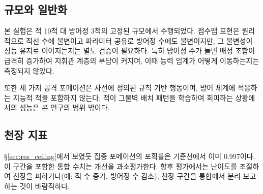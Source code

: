 \subsection{규모와 일반화}

본 실험은 적 10척 대 방어정 3척의 고정된 규모에서 수행되었다. 점수맵 표현은 원리적으로 적선
수에 불변이고 파라미터 공유로 방어정 수에도 불변이지만, 그 불변성이 성능 유지로 이어지는지는
별도 검증이 필요하다. 특히 방어정 수가 늘면 배정 조합이 급격히 증가하여 지휘관 계층의 부담이
커지며, 이때 능력 임계가 어떻게 이동하는지는 측정되지 않았다.

또한 세 가지 공격 포메이션은 사전에 정의된 규칙 기반 행동이며, 방어 체계에 적응하는 지능적
적을 포함하지 않는다. 적이 그물벽 배치 패턴을 학습하여 회피하는 상황에서의 성능은 본 연구의
범위 밖이다.

\subsection{천장 지표}

\S\ref{sec:res_ceiling}에서 보였듯 집중 포메이션의 포획률은 기준선에서 이미 0.997이다. 이
구간을 포함한 통합 수치는 개선을 과소평가한다. 향후 평가에서는 난이도를 조절하여 천장을
피하거나(예: 적 수 증가, 방어정 수 감소), 천장 구간을 통합에서 분리 보고하는 것이 바람직하다.
